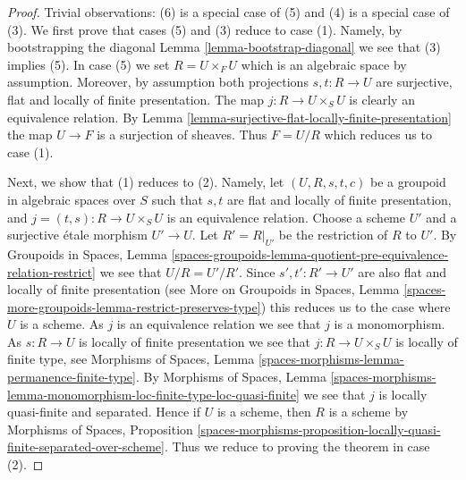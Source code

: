 \begin{proof}
Trivial observations: (6) is a special case of (5) and
(4) is a special case of (3).
We first prove that cases (5) and (3) reduce to case (1).
Namely, by bootstrapping the diagonal
Lemma \ref{lemma-bootstrap-diagonal}
we see that (3) implies (5). In case (5) we set $R = U \times_F U$ which
is an algebraic space by assumption. Moreover, by assumption both
projections $s, t : R \to U$ are surjective, flat and locally of
finite presentation. The map $j : R \to U \times_S U$ is clearly an
equivalence relation. By
Lemma \ref{lemma-surjective-flat-locally-finite-presentation}
the map $U \to F$ is a surjection of sheaves. Thus $F = U/R$
which reduces us to case (1).

\medskip\noindent
Next, we show that (1) reduces to (2).
Namely, let $(U, R, s, t, c)$ be a groupoid in algebraic spaces
over $S$ such that $s, t$ are flat and locally of finite presentation, and
$j = (t, s) : R \to U \times_S U$ is an equivalence relation.
Choose a scheme $U'$ and a surjective \'etale morphism $U' \to U$.
Let $R' = R|_{U'}$ be the restriction of $R$ to $U'$. By
Groupoids in Spaces,
Lemma \ref{spaces-groupoids-lemma-quotient-pre-equivalence-relation-restrict}
we see that $U/R = U'/R'$. Since $s', t' : R' \to U'$ are also
flat and locally of finite presentation (see
More on Groupoids in Spaces,
Lemma \ref{spaces-more-groupoids-lemma-restrict-preserves-type})
this reduces us to the case where $U$ is a scheme.
As $j$ is an equivalence relation we see that $j$ is a monomorphism.
As $s : R \to U$ is locally of finite presentation we see that
$j : R \to U \times_S U$ is locally of finite type, see
Morphisms of Spaces, Lemma \ref{spaces-morphisms-lemma-permanence-finite-type}.
By
Morphisms of Spaces, Lemma
\ref{spaces-morphisms-lemma-monomorphism-loc-finite-type-loc-quasi-finite}
we see that $j$ is locally quasi-finite and separated.
Hence if $U$ is a scheme, then $R$ is a scheme by
Morphisms of Spaces, Proposition
\ref{spaces-morphisms-proposition-locally-quasi-finite-separated-over-scheme}.
Thus we reduce to proving the theorem in case (2).


\end{proof}
